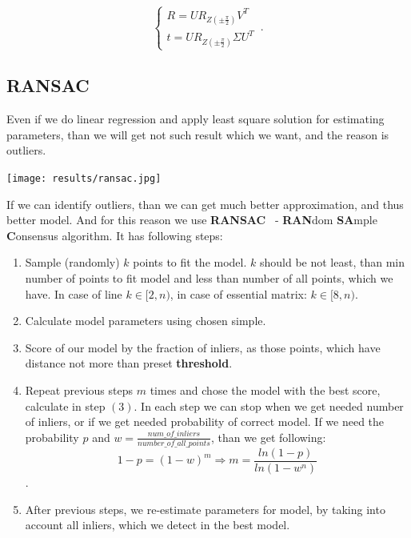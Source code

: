 \begin{equation}
    \begin{cases}
        R = U R_{Z(\pm  \frac{\pi}{2})} V^{T}\\
        t = U R_{Z(\pm  \frac{\pi}{2})} \Sigma U^{T}
    \end{cases}\,.
\end{equation}

\subsection{RANSAC}

Even if we do linear regression and apply least square solution for estimating parameters, than we will get not such result which we want, and the reason is outliers. 
\begin{center}
    \texttt{[image: results/ransac.jpg]}\\[1cm]
\end{center}

If we can identify outliers, than we can get much better approximation, and thus better model. And for this reason we use {\bf RANSAC}~\cite{RANSAC} - {\bf RAN}dom {\bf SA}mple {\bf C}onsensus algorithm. It has following steps:

\begin{enumerate}
    \item Sample (randomly) $k$ points to fit the model. $k$ should be not least, than min number of points to fit model and less than number of all points, which we have. In case of line $k \in [2,n)$, in case of essential matrix: $k \in [8,n)$.
    \item Calculate model parameters using chosen simple.
    \item Score of our model by the fraction of inliers, as those points, which have distance not more than preset {\bf threshold}. 
    \item Repeat previous steps $m$ times and chose the model with the best score, calculate in step $(3)$. In each step we can stop when we get needed number of inliers, or if we get needed probability of correct model. If we need the probability $p$ and $w = \frac{num\_of\_inliers}{number\_of\_all\_points}$, than we get following:
    $$1-p = (1-w)^m \Rightarrow m=\frac{ln(1-p)}{ln(1-w^n)}$$.
    \item After previous steps, we re-estimate parameters for model, by taking into account all inliers, which we detect in the best model.
\end{enumerate}

